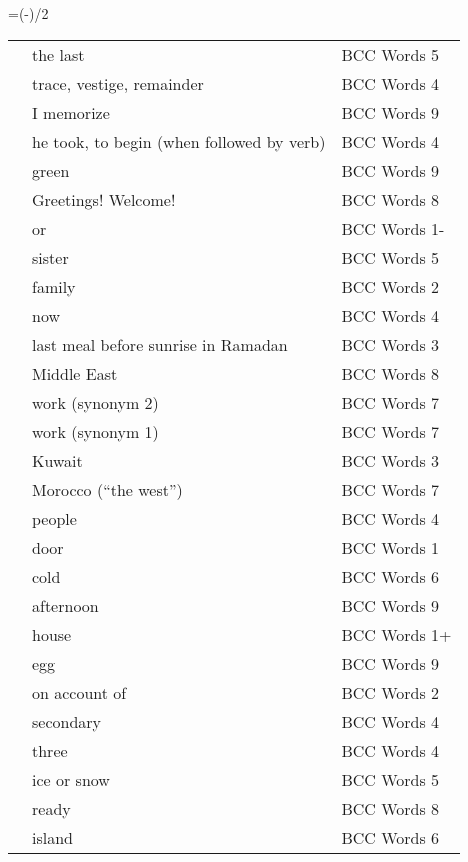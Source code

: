 \documentclass[10pt]{article}
\makeatletter
\newenvironment{indextable}{
\newbox\myb
\setbox\myb\vbox\bgroup\hsize=\dimexpr(\textwidth-\columnsep)/2\relax
\makeatletter
\chardef\LT@end@pen\z@
\makeatother
\begin{longtable}{p{0.1\textwidth}p{0.2\textwidth}>{\scriptsize}p{0.2\textwidth}}
}{
\end{longtable}\egroup
\setlength{\columnseprule}{0.4pt}
\begin{multicols*}{2}
\unvbox\myb
\end{multicols*}
}
\makeatother
\begin{document}

\begin{indextable}
\ta{آخِر} & the last & BCC Words 5 \\
\ta{أَثَر،آثار} & trace, vestige, remainder & BCC Words 4 \\
\ta{أَحْفَظ} & I memorize & BCC Words 9 \\
\ta{أَخَذَ} & he took, to begin (when followed by verb) & BCC Words 4 \\
\ta{أَخْضَر} & green & BCC Words 9 \\
\ta{أَهْلًا وَسَهْلًا‎} & Greetings! Welcome! & BCC Words 8 \\
\ta{أَوْ} & or & BCC Words 1- \\
\ta{أُخْت،أَخَوات} & sister & BCC Words 5 \\
\ta{أُسْرة،أُسَر} & family & BCC Words 2 \\
\ta{الآن} & now & BCC Words 4 \\
\ta{السُّحور} & last meal before sunrise in Ramadan & BCC Words 3 \\
\ta{الشَّرْق الأَوْسَط} & Middle East & BCC Words 8 \\
\ta{الشُّغْل} & work (synonym 2) & BCC Words 7 \\
\ta{العَمَل} & work (synonym 1) & BCC Words 7 \\
\ta{الكُوَيْت} & Kuwait & BCC Words 3 \\
\ta{المَغْرِب} & Morocco (``the west'') & BCC Words 7 \\
\ta{النّاس} & people & BCC Words 4 \\
\ta{باب،أَبْواب} & door & BCC Words 1 \\
\ta{بارِد} & cold & BCC Words 6 \\
\ta{بَعْد الظُّهْر} & afternoon & BCC Words 9 \\
\ta{بَيْت,بُيُوت} & house & BCC Words 1+ \\
\ta{بَيْض} & egg & BCC Words 9 \\
\ta{بِسَبَب} & on account of & BCC Words 2 \\
\ta{ثانَوي} & secondary & BCC Words 4 \\
\ta{ثَلاثة،۳} & three & BCC Words 4 \\
\ta{ثَلْج} & ice or snow & BCC Words 5 \\
\ta{جاهِز،جاهِزة} & ready & BCC Words 8 \\
\ta{جَزيرة،جُزُر} & island & BCC Words 6 \\

\end{indextable}
\end{document}
